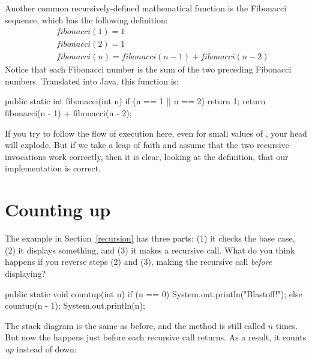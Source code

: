 \label{fibonacci}


Another common recursively-defined mathematical function is the Fibonacci sequence, which has the following definition:
%
\begin{eqnarray*}
&& fibonacci(1) = 1 \\
&& fibonacci(2) = 1 \\
&& fibonacci(n) = fibonacci(n-1) + fibonacci(n-2)
\end{eqnarray*}
%
Notice that each Fibonacci number is the sum of the two preceding Fibonacci numbers.
Translated into Java, this function is:

\begin{code}
public static int fibonacci(int n) {
    if (n == 1 || n == 2) {
        return 1;
    }
    return fibonacci(n - 1) + fibonacci(n - 2);
}
\end{code}

If you try to follow the flow of execution here, even for small values of , your head will explode.
But if we take a leap of faith and assume that the two recursive invocations work correctly, then it is clear, looking at the definition, that our implementation is correct.


\section{Counting up}
\label{countup}

The  example in Section~\ref{recursion} has three parts: (1) it checks the base case, (2) it displays something, and (3) it makes a recursive call.
What do you think happens if you reverse steps (2) and (3), making the recursive call {\em before} displaying?

\begin{code}
public static void countup(int n) {
    if (n == 0) {
        System.out.println("Blastoff!");
    } else {
        countup(n - 1);
        System.out.println(n);
    }
}
\end{code}

The stack diagram is the same as before, and the method is still called $n$ times.
But now the  happens just before each recursive call returns.
As a result, it counts {\em up} instead of down:

